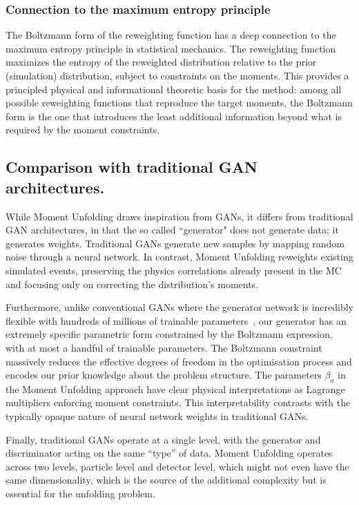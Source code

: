         \subsubsection{Connection to the maximum entropy principle}
            The Boltzmann form of the reweighting function has a deep connection to the maximum entropy principle in statistical mechanics.
            The reweighting function maximizes the entropy of the reweighted distribution relative to the prior (simulation) distribution, subject to constraints on the moments.
            This provides a principled physical and informational theoretic basis for the method: among all possible reweighting functions that reproduce the target moments, the Boltzmann form is the one that introduces the least additional information beyond what is required by the moment constraints.

    \subsection{Comparison with traditional GAN architectures.}
        While Moment Unfolding draws inspiration from GANs, it differs from traditional GAN architectures, in that the so called ``generator" does not generate data; it generates weights.
        Traditional GANs generate new samples by mapping random noise through a neural network.
        In contrast, Moment Unfolding reweights existing simulated events, preserving the physics correlations already present in the MC and focusing only on correcting the distribution's moments.
    
        Furthermore, unlike conventional GANs where the generator network is incredibly flexible with hundreds of millions of trainable parameters~\cite{brock_large_2019, karras_analyzing_2020, Lee2022BigVGAN:Training}, our generator has an extremely specific parametric form constrained by the Boltzmann expression, with at most a handful of trainable parameters.
        The Boltzmann constraint massively reduces the effective degrees of freedom in the optimisation process and encodes our prior knowledge about the problem structure.
        The parameters $\beta_a$ in the Moment Unfolding approach have clear physical interpretations as Lagrange multipliers enforcing moment constraints.
        This interpretability contrasts with the typically opaque nature of neural network weights in traditional GANs.
    
        Finally, traditional GANs operate at a single level, with the generator and discriminator acting on the same ``type'' of data.
        Moment Unfolding operates across two levels, particle level and detector level, which might not even have the same dimensionality, which is the source of the additional complexity but is essential for the unfolding problem.
        
